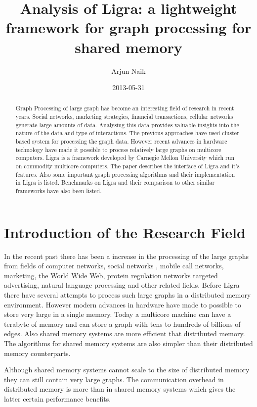 \documentclass[a4paper,10pt,twoside]{article}
\title{ Analysis of Ligra: a lightweight framework for graph processing for shared memory}
\author{Arjun Naik}
\date{2013-05-31}
\begin{document}
\maketitle

\begin{abstract}
Graph Processing of large graph has become an interesting field of research in recent years. Social networks, marketing strategies, financial transactions, cellular networks generate large amounts of data. Analysing this data provides valuable insights into the nature of the data and type of interactions.  The previous approaches have used cluster based system for processing the graph data. However recent advances in hardware technology have made it possible to process relatively large graphs on multicore computers. Ligra \cite{Shun:2013:LLG:2442516.2442530} is a framework developed by Carnegie Mellon University which run on commodity multicore computers. The paper describes the interface of Ligra and it's features. Also some important graph processing algorithms and their implementation in Ligra is listed. Benchmarks on Ligra and their comparison to other similar frameworks have also been listed.
\end{abstract}

\tableofcontents

\section{Introduction of the Research Field}

In the recent past there has been a increase in the processing of the large graphs from fields of computer networks, social networks , mobile call networks, marketing, the World Wide Web, protein regulation networks targeted advertising, natural language processing and other related fields. Before Ligra there have several attempts to process such large graphs in a distributed memory environment. However modern advances in hardware have made to possible to store very large in a single memory. Today a multicore machine can have a terabyte of memory and can store a graph with tens to hundreds of billions of edges. Also shared memory systems are more efficient that distributed memory. The algorithms for shared memory systems are also simpler than their distributed memory counterparts.

	Although shared memory systems cannot scale to the size of distributed memory they can still contain very large graphs. The communication overhead in distributed memory is more than in shared memory systems which gives the latter certain performance benefits. 
\end{document}
